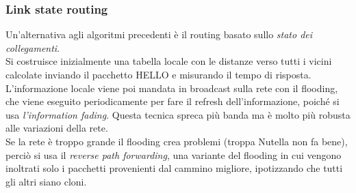 \documentclass[10pt,a4paper,twoside]{article}
\begin{document}
\subsubsection{Link state routing}
Un'alternativa agli algoritmi precedenti è il routing basato sullo \textit{stato dei collegamenti}.\\
Si costruisce inizialmente una tabella locale con le distanze verso tutti i vicini calcolate inviando il pacchetto HELLO e misurando il tempo di risposta. L'informazione locale viene poi mandata in broadcast sulla rete con il flooding, che viene eseguito periodicamente per fare il refresh dell'informazione, poiché si usa \textit{l'information fading}. Questa tecnica spreca più banda ma è molto più robusta alle variazioni della rete.\\
Se la rete è troppo grande il flooding crea problemi (troppa Nutella non fa bene), perciò si usa il \textit{reverse path forwarding}, una variante del flooding in cui vengono inoltrati solo i pacchetti provenienti dal cammino migliore, ipotizzando che tutti gli altri siano cloni.
\end{document}
